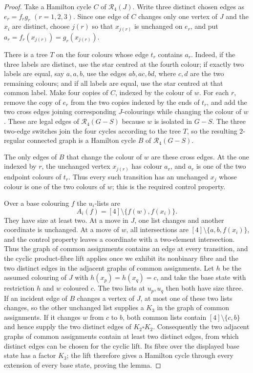 \documentclass[11pt]{article}
\theoremstyle{remark}
\newcommand{\R}{\mathcal R}
\numberwithin{equation}{section}
\numberwithin{table}{section}
\begin{document}
\begin{proof}
Take a Hamilton cycle $C$ of $\R_4(J)$.  Write three distinct chosen edges
as $e_r=f_rg_r$ $(r=1,2,3)$.  Since one edge of $C$ changes only one vertex
of $J$ and the $x_i$ are distinct, choose $j(r)$ so that $x_{j(r)}$ is
unchanged on $e_r$, and put
$a_r=f_r(x_{j(r)})=g_r(x_{j(r)})$.

There is a tree $T$ on the four colours whose edge $t_r$ contains $a_r$.
Indeed, if the three labels are distinct, use the star centred at the fourth
colour; if exactly two labels are equal, say $a,a,b$, use the edges
$ab,ac,bd$, where $c,d$ are the two remaining colours; and if all labels
are equal, use the star centred at that common label.  Make four copies of
$C$, indexed by the colour of $w$.  For each $r$, remove the copy of $e_r$
from the two copies indexed by the ends of $t_r$, and add the two cross
edges joining corresponding $J$-colourings while changing the colour of
$w$.  These are legal edges of $\R_4(G-S)$ because $w$ is isolated in
$G-S$.  The three two-edge switches join the four cycles according to the
tree $T$, so the resulting $2$-regular connected graph is a Hamilton cycle
$B$ of $\R_4(G-S)$.

The only edges of $B$ that change the colour of $w$ are these cross edges.
At the one indexed by $r$, the unchanged vertex $x_{j(r)}$ has colour $a_r$,
and $a_r$ is one of the two endpoint colours of $t_r$.  Thus every such
transition has an unchanged $x_j$ whose colour is one of the two colours of
$w$; this is the required control property.

Over a base colouring $f$ the $u_i$-lists are
\[
 A_i(f)=[4]\setminus\{f(w),f(x_i)\}.
\]
They have size at least two.  At a move in $J$, one list changes and another
coordinate is unchanged.  At a move of $w$, all intersections are
$[4]\setminus\{a,b,f(x_i)\}$, and the control property leaves a coordinate
with a two-element intersection.  Thus the graph of common assignments contains an edge at every transition, and the
cyclic product-fibre lift applies once we exhibit its nonbinary fibre and the
two distinct edges in the adjacent graphs of common assignments.  Let $h$ be the assumed colouring of
$J$ with $h(x_p)=h(x_q)=c$, and take the base state with restriction $h$ and
$w$ coloured $c$.  The two lists at $u_p,u_q$ then both have size three.  If
an incident edge of $B$ changes a vertex of $J$, at most one of these two
lists changes, so the other unchanged list supplies a $K_3$ in the graph of common assignments.  If it changes $w$ from $c$ to $b$, both common lists contain
$[4]\setminus\{c,b\}$ and hence supply the two distinct edges of
$K_2\square K_2$.  Consequently the two adjacent graphs of common assignments contain at
least two distinct edges, from which distinct edges can be chosen for the
cyclic lift.  Its fibre over the displayed base state has a factor $K_3$;
the lift therefore gives a Hamilton cycle through every extension of every
base state, proving the lemma.
\end{proof}
\end{document}
